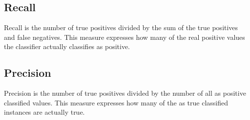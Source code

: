 \documentclass[a4paper,11pt]{article}
\begin{document}
    \subsection{Recall}
        Recall is the number of true positives divided by the sum of the true positives and false negatives. %
        This measure expresses how many of the real positive values the classifier actually classifies as positive.
    
    \subsection{Precision}
        Precision is the number of true positives divided by the number of all as positive classified values. %
        This measure expresses how many of the as true classified instances are actually true.
        
\end{document}

